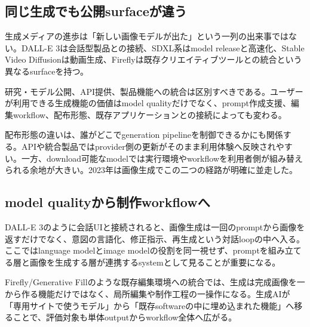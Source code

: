 
\subsection{同じ生成でも公開surfaceが違う}

生成メディアの進歩は「新しい画像モデルが出た」という一列の出来事ではない。DALL-E 3は会話型製品との接続、SDXL系はmodel releaseと高速化、Stable Video Diffusionは動画生成、Fireflyは既存クリエイティブツールとの統合という異なるsurfaceを持つ。\autocite{src-091bbe9dbf4e,src-096341c0ccf6,src-0b410c70bfc7,src-18f22707bf78,src-2b694ab9a461,src-2c97fc5583a3,src-317afaba6510,src-9bc8e7751f80,src-9da0d929aa45,src-a4f61fbe35c5,src-ba80e5e27a11,src-e79065444906}


研究・モデル公開、API提供、製品機能への統合は区別すべきである。ユーザーが利用できる生成機能の価値はmodel qualityだけでなく、prompt作成支援、編集workflow、配布形態、既存アプリケーションとの接続によっても変わる。\autocite{src-091bbe9dbf4e,src-18f22707bf78,src-2b694ab9a461,src-317afaba6510,src-9bc8e7751f80,src-9da0d929aa45,src-a4f61fbe35c5,src-ba80e5e27a11,src-e79065444906}


配布形態の違いは、誰がどこでgeneration pipelineを制御できるかにも関係する。APIや統合製品ではprovider側の更新がそのまま利用体験へ反映されやすい。一方、download可能なmodelでは実行環境やworkflowを利用者側が組み替えられる余地が大きい。2023年は画像生成でこの二つの経路が明確に並走した。\autocite{src-091bbe9dbf4e,src-18f22707bf78,src-2b694ab9a461,src-317afaba6510,src-9bc8e7751f80,src-9da0d929aa45,src-a4f61fbe35c5,src-ba80e5e27a11,src-e79065444906}


\subsection{model qualityから制作workflowへ}

DALL-E 3のように会話UIと接続されると、画像生成は一回のpromptから画像を返すだけでなく、意図の言語化、修正指示、再生成という対話loopの中へ入る。ここではlanguage modelとimage modelの役割を同一視せず、promptを組み立てる層と画像を生成する層が連携するsystemとして見ることが重要になる。\autocite{src-9bc8e7751f80,src-ba80e5e27a11}


Firefly/Generative Fillのような既存編集環境への統合では、生成は完成画像を一から作る機能だけではなく、局所編集や制作工程の一操作になる。生成AIが「専用サイトで使うモデル」から「既存softwareの中に埋め込まれた機能」へ移ることで、評価対象も単体outputからworkflow全体へ広がる。\autocite{src-2b694ab9a461,src-a4f61fbe35c5}


